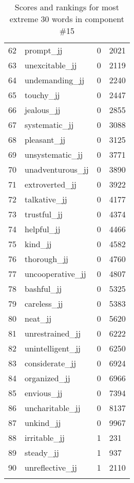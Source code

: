 \begin{longtable}[!htbp]{| rlr@{.}l |}
    62 & prompt\_jj & 0 & 2021 \\
    63 & unexcitable\_jj & 0 & 2119 \\
    64 & undemanding\_jj & 0 & 2240 \\
    65 & touchy\_jj & 0 & 2447 \\
    66 & jealous\_jj & 0 & 2855 \\
    67 & systematic\_jj & 0 & 3088 \\
    68 & pleasant\_jj & 0 & 3125 \\
    69 & unsystematic\_jj & 0 & 3771 \\
    70 & unadventurous\_jj & 0 & 3890 \\
    71 & extroverted\_jj & 0 & 3922 \\
    72 & talkative\_jj & 0 & 4177 \\
    73 & trustful\_jj & 0 & 4374 \\
    74 & helpful\_jj & 0 & 4466 \\
    75 & kind\_jj & 0 & 4582 \\
    76 & thorough\_jj & 0 & 4760 \\
    77 & uncooperative\_jj & 0 & 4807 \\
    78 & bashful\_jj & 0 & 5325 \\
    79 & careless\_jj & 0 & 5383 \\
    80 & neat\_jj & 0 & 5620 \\
    81 & unrestrained\_jj & 0 & 6222 \\
    82 & unintelligent\_jj & 0 & 6250 \\
    83 & considerate\_jj & 0 & 6924 \\
    84 & organized\_jj & 0 & 6966 \\
    85 & envious\_jj & 0 & 7394 \\
    86 & uncharitable\_jj & 0 & 8137 \\
    87 & unkind\_jj & 0 & 9967 \\
    88 & irritable\_jj & 1 & 231 \\
    89 & steady\_jj & 1 & 937 \\
    90 & unreflective\_jj & 1 & 2110 \\
    \hline
    \caption{Scores and rankings for most extreme 30 words in component \#15} \\
\end{longtable}
